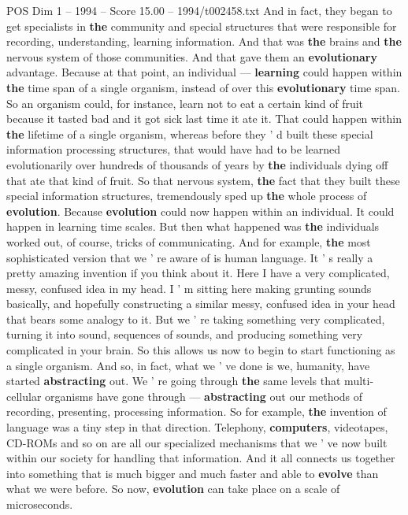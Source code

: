 \begin{textsample}{POS Dim 1 – 1994 – Score 15.00 – 1994/t002458.txt}
And in fact, they began to get specialists in \textbf{the} community and special structures that were responsible for recording, understanding, learning information.
And that was \textbf{the} brains and \textbf{the} nervous system of those communities.
And that gave them an \textbf{evolutionary} advantage.
Because at that point, an individual — \textbf{learning} could happen within \textbf{the} time span of a single organism, instead of over this \textbf{evolutionary} time span.
So an organism could, for instance, learn not to eat a certain kind of fruit because it tasted bad and it got sick last time it ate it.
That could happen within \textbf{the} lifetime of a single organism, whereas before they ' d built these special information processing structures, that would have had to be learned evolutionarily over hundreds of thousands of years by \textbf{the} individuals dying off that ate that kind of fruit.
So that nervous system, \textbf{the} fact that they built these special information structures, tremendously sped up \textbf{the} whole process of \textbf{evolution}.
Because \textbf{evolution} could now happen within an individual.
It could happen in learning time scales.
But then what happened was \textbf{the} individuals worked out, of course, tricks of communicating.
And for example, \textbf{the} most sophisticated version that we ' re aware of is human language.
It ' s really a pretty amazing invention if you think about it.
Here I have a very complicated, messy, confused idea in my head.
I ' m sitting here making grunting sounds basically, and hopefully constructing a similar messy, confused idea in your head that bears some analogy to it.
But we ' re taking something very complicated, turning it into sound, sequences of sounds, and producing something very complicated in your brain.
So this allows us now to begin to start functioning as a single organism.
And so, in fact, what we ' ve done is we, humanity, have started \textbf{abstracting} out.
We ' re going through \textbf{the} same levels that multi-cellular organisms have gone through — \textbf{abstracting} out our methods of recording, presenting, processing information.
So for example, \textbf{the} invention of language was a tiny step in that direction.
Telephony, \textbf{computers}, videotapes, CD-ROMs and so on are all our specialized mechanisms that we ' ve now built within our society for handling that information.
And it all connects us together into something that is much bigger and much faster and able to \textbf{evolve} than what we were before.
So now, \textbf{evolution} can take place on a scale of microseconds.

\end{textsample}
